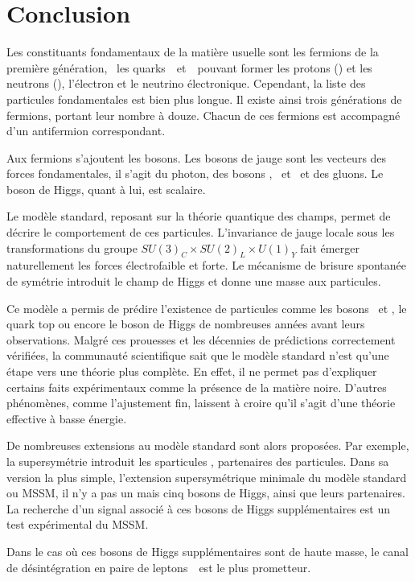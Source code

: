 \section{Conclusion}\label{chapter-MS-MSSM-section-conclusion}
Les constituants fondamentaux de la matière usuelle sont les fermions de la première génération, \ie\ les quarks~\quarku\ et~\quarkd\ pouvant former les protons (\quarku\quarku\quarkd) et les neutrons (\quarku\quarkd\quarkd), l'électron et le neutrino électronique.
Cependant, la liste des particules fondamentales est bien plus longue.
Il existe ainsi trois générations de fermions, portant leur nombre à douze.
Chacun de ces fermions est accompagné d'un antifermion correspondant.
\par Aux fermions s'ajoutent les bosons.
Les bosons de jauge sont les vecteurs des forces fondamentales, il s'agit du photon, des bosons \Wbosonplus, \Wbosonminus\ et \Zboson\ et des gluons.
Le boson de Higgs, quant à lui, est scalaire.
\par Le modèle standard, reposant sur la théorie quantique des champs, permet de décrire le comportement de ces particules.
L'invariance de jauge locale sous les transformations du groupe $SU(3)_C \times SU(2)_L \times U(1)_Y$ fait émerger naturellement les forces électrofaible et forte.
Le mécanisme de brisure spontanée de symétrie introduit le champ de Higgs et donne une masse aux particules.
\par Ce modèle a permis de prédire l'existence de particules comme les bosons \Wboson\ et \Zboson, le quark top ou encore le boson de Higgs de nombreuses années avant leurs observations.
Malgré ces prouesses et les décennies de prédictions correctement vérifiées, la communauté scientifique sait que le modèle standard n'est qu'une étape vers une théorie plus complète.
En effet, il ne permet pas d'expliquer certains faits expérimentaux comme la présence de la matière noire.
D'autres phénomènes, comme l'ajustement fin, laissent à croire qu'il s'agit d'une théorie effective à basse énergie.
\par De nombreuses extensions au modèle standard sont alors proposées.
Par exemple, la supersymétrie
introduit les \og sparticules \fg, partenaires des particules.
Dans sa version la plus simple, l'extension supersymétrique minimale du modèle standard ou MSSM, il n'y a pas un mais cinq bosons de Higgs, ainsi que leurs partenaires.
La recherche d'un signal associé à ces bosons de Higgs supplémentaires est un test expérimental du MSSM.
\par Dans le cas où ces bosons de Higgs supplémentaires sont de haute masse, le canal de désintégration en paire de leptons~\tau\ est le plus prometteur.
